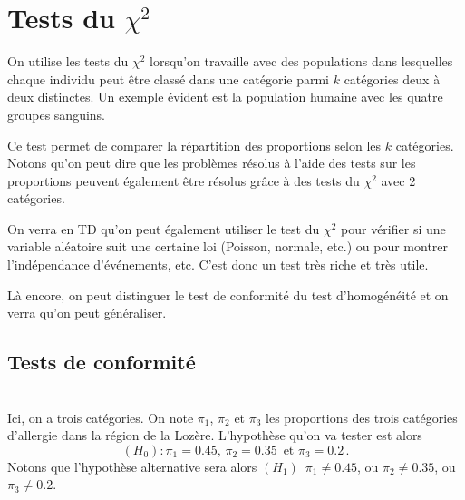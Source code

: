 \documentclass[12pt, a4paper]{book}
\numberwithin{equation}{section}
\begin{document}
\section[Tests du chi-2]{Tests du $\chi^2$}

On utilise les tests du $\chi^2$ lorsqu'on travaille avec des populations dans lesquelles
chaque individu peut être classé dans une catégorie parmi 
$k$ catégories deux à deux distinctes. Un exemple évident est la population humaine avec les quatre groupes sanguins.

Ce test permet de comparer la répartition des proportions selon les $k$ catégories. 
Notons qu'on peut dire que les problèmes résolus à l'aide des tests sur les proportions peuvent également être résolus grâce à des tests du $\chi^2$ avec 2 catégories.

On verra en TD qu'on peut également utiliser le test du $\chi^2$ pour vérifier si une variable aléatoire
suit une certaine loi (Poisson, normale, etc.) ou pour montrer l'indépendance d'événements, etc. 
C'est donc un test très riche et très utile.

Là encore, on peut distinguer le test de conformité du test d'homogénéité et on verra qu'on peut généraliser.

\subsection{Tests de conformité} 


\\

Ici, on a trois catégories. On note $\pi_1$, $\pi_2$ et $\pi_3$ les proportions des trois catégories
 d'allergie dans la région de la Lozère. L'hypothèse qu'on va tester est alors  
$$
(H_0) : \pi_1=0.45, \, \pi_2=0.35 \, {\mbox { et }}  \pi_3=0.2\,.
$$
Notons que l'hypothèse alternative sera alors 
$(H_1)\,$ $\pi_1\neq 0.45$, ou $\pi_2\neq 0.35$, ou $\pi_3\neq 0.2$. 
\end{document}
